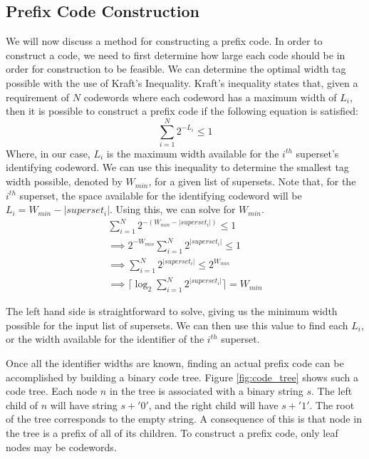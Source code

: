 \subsection{Prefix Code Construction}
We will now discuss a method for constructing a prefix code. In order to construct a code, we need to first determine how large each code should be in order for construction to be feasible. We can determine the optimal width tag possible with the use of Kraft's Inequality. Kraft's inequality states that, given a requirement of $N$ codewords where each codeword has a maximum width of $L_i$, then it is possible to construct a prefix code if the following equation is satisfied:
$$ \sum_{i = 1}^{N}{2^{-L_i} \le 1} $$
Where, in our case, $L_i$ is the maximum width available for the $i^{th}$ superset's identifying codeword. We can use this inequality to determine the smallest tag width possible, denoted by $W_{min}$, for a given list of supersets. Note that, for the $i^{th}$ superset, the space available for the identifying codeword will be $L_i = W_{min} - |superset_i|$. Using this, we can solve for $W_{min}$.\\

\begin{equation} \label{eq1}
 \begin{split}
  \sum_{i = 1}^{N}{2^{-(W_{min} - |superset_i|)}}   \le  1 \\
  \implies 2^{-W_{min}} \sum_{i = 1}^{N}{2^{|superset_i|}}   \le  1 \\
  \implies  \sum_{i = 1}^{N}{2^{|superset_i|}}   \le  2^{W_{min}} \\
 \implies   \lceil\log_2{\sum_{i = 1}^{N}{2^{|superset_i|}}}\rceil  =  W_{min}
\end{split}
 \end{equation}
 
 The left hand side is straightforward to solve, giving us the minimum width possible for the input list of supersets. We can then use this value to find each $L_i$, or the width available for the identifier of the $i^{th}$ superset.
 
 Once all the identifier widths are known, finding an actual prefix code can be accomplished by building a binary code tree. Figure \ref{fig:code_tree} shows such a code tree. Each node $n$ in the tree is associated with a binary string $s$. The left child of $n$ will have string $s + '0'$, and the right child will have $s + '1'$. The root of the tree corresponds to the empty string. A consequence of this is that node in the tree is a prefix of all of its children. To construct a prefix code, only leaf nodes may be codewords. 
 
